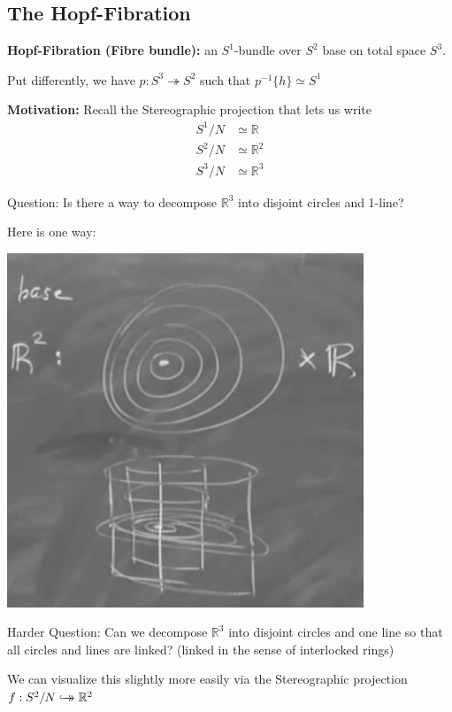 \documentclass[12pt]{article}
\newcommand{\R}{\mathbb{R}}
\newcommand{\biject}{\hookrightarrow \hspace{-8pt} \rightarrow}
\begin{document}
    \subsection*{The Hopf-Fibration}
    \textbf{Hopf-Fibration (Fibre bundle):} an $S^1$-bundle over $S^2$ base on total space $S^3$. 

    Put differently, we have $p: S^3 \twoheadrightarrow S^2$ such that $p^{-1}\{h\} \simeq S^1$

    \textbf{Motivation:} Recall the Stereographic projection that lets us write 
    \begin{align*}
        S^1/N &\simeq \R\\ 
        S^2/N &\simeq \R^2\\
        S^3/N &\simeq \R^3
    \end{align*}

    Question: Is there a way to decompose $\R^3$ into disjoint circles and 1-line? 

    Here is one way: 
    \begin{center}
        \includegraphics[width=0.8\textwidth]{Images/April 16 - Disjoint circles.png}  
    \end{center}
    
    Harder Question: Can we decompose $\R^3$ into disjoint circles and one line so that all circles and lines are linked? (linked in the sense of interlocked rings)

    We can visualize this slightly more easily via the Stereographic projection $f: S^2/N \biject \R^2$
\end{document}
